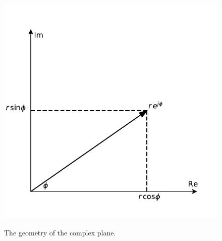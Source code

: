 \documentclass[12pt,oneside]{book}
\begin{document}
\begin{figure}[htbp]
\begin{center}
\includegraphics[height=0.3\textheight]{figs/complex.pdf} \\
\caption{ The geometry of the complex plane.}
\label{fig:complex}
\end{center}
\end{figure}
\end{document}
